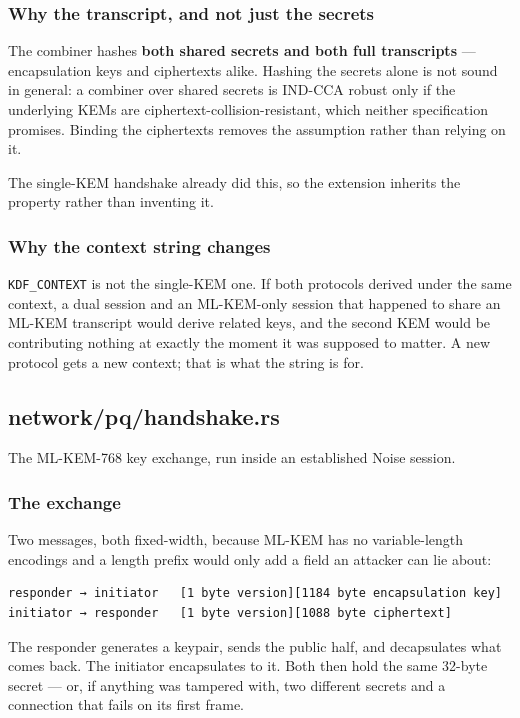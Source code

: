 \documentclass[11pt,a4paper]{article}
\begin{document}
\subsubsection{Why the transcript, and not just the secrets}

The combiner hashes \textbf{both shared secrets and both full transcripts} —
encapsulation keys and ciphertexts alike. Hashing the secrets alone is not
sound in general: a combiner over shared secrets is IND-CCA robust only if
the underlying KEMs are ciphertext-collision-resistant, which neither
specification promises. Binding the ciphertexts removes the assumption
rather than relying on it.

The single-KEM handshake already did this, so the extension inherits the
property rather than inventing it.

\subsubsection{Why the context string changes}

\texttt{KDF\_CONTEXT} is not the single-KEM one. If both protocols derived under
the same context, a dual session and an ML-KEM-only session that happened to
share an ML-KEM transcript would derive related keys, and the second KEM
would be contributing nothing at exactly the moment it was supposed to
matter. A new protocol gets a new context; that is what the string is for.

\subsection{network/pq/handshake.rs}
The ML-KEM-768 key exchange, run inside an established Noise session.

\subsubsection{The exchange}

Two messages, both fixed-width, because ML-KEM has no variable-length
encodings and a length prefix would only add a field an attacker can lie
about:

\begin{verbatim}
responder → initiator   [1 byte version][1184 byte encapsulation key]
initiator → responder   [1 byte version][1088 byte ciphertext]
\end{verbatim}

The responder generates a keypair, sends the public half, and decapsulates
what comes back. The initiator encapsulates to it. Both then hold the same
32-byte secret — or, if anything was tampered with, two different secrets
and a connection that fails on its first frame.
\end{document}
